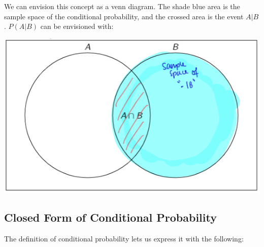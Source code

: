 \documentclass{report}
\begin{document}
        We can envision this concept as a venn diagram. The shade blue area is the sample space of the conditional probability, and the crossed area is the event $A|B$. $P(A|B)$ can be envisioned with:
        \begin{center}
            \includegraphics{2022-12-16-13-27-57.png}
        \end{center}

        \subsection{Closed Form of Conditional Probability}

        The definition of conditional probability lets us express it with the following:
\end{document}
